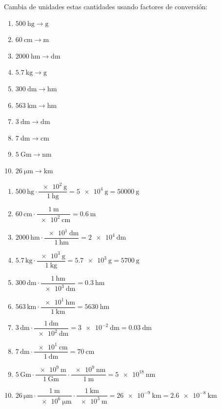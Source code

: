 \begin{exercise}
    Cambia de unidades estas cantidades usando factores de conversión:
    \begin{enumerate}[label=\letraminuscula]
        \item \(\qty{500}{\hecto\gram} \to \unit{\g}\)
        \item \(\qty{60}{\cm} \to \unit{\m}\)
        \item \(\qty{2000}{\hecto\m} \to \unit{\deca\m}\)
        \item \(\qty{5.7}{\kg} \to \unit{\g}\)
        \item \(\qty{300}{\dm} \to \unit{\hecto\m}\)
        \item \(\qty{563}{\km} \to \unit{\hecto\m}\)
        \item \(\qty{3}{\dm} \to \unit{\deca\m}\)
        \item \(\qty{7}{\dm} \to \unit{\cm}\)
        \item \(\qty{5}{\giga\m} \to \unit{\nano\m}\)
        \item \(\qty{26}{\micro\m} \to \unit{\km}\)
    \end{enumerate}
    \begin{solu}
        \begin{enumerate}[label=\alph*)]
            \item \(\num{500}\,\unit{\hecto\gram} \cdot \dfrac{\qty{e2}{\g}}{\qty{1}{\hecto\gram}} = \qty{5e4}{\g} = \qty{50000}{\g}\)
            \item \(\num{60}\,\unit{\cm} \cdot \dfrac{\qty{1}{\m}}{\qty{e2}{\cm}} = \qty{0.6}{\m}\)
            \item \(\num{2000}\,\unit{\hecto\m} \cdot \dfrac{\qty{e1}{\deca\m}}{\qty{1}{\hecto\m}} = \qty{2e4}{\deca\m}\)
            \item \(\num{5.7}\,\unit{\kg} \cdot \dfrac{\qty{e3}{\g}}{\qty{1}{\kg}} = \qty{5.7e3}{\g} = \qty{5700}{\g}\)
            \item \(\num{300}\,\unit{\dm} \cdot \dfrac{\qty{1}{\hecto\m}}{\qty{e3}{\dm}} = \qty{0.3}{\hecto\m}\)
            \item \(\num{563}\,\unit{\km} \cdot \dfrac{\qty{e1}{\hecto\m}}{\qty{1}{\km}} = \qty{5630}{\hecto\m}\)
            \item \(\num{3}\,\unit{\dm} \cdot \dfrac{\qty{1}{\deca\m}}{\qty{e2}{\dm}} = \qty{3e-2}{\deca\m} = \qty{0.03}{\deca\m}\)
            \item \(\num{7}\,\unit{\dm} \cdot \dfrac{\qty{e1}{\cm}}{\qty{1}{\dm}} = \qty{70}{\cm}\)
            \item \(\num{5}\,\unit{\giga\m} \cdot \dfrac{\qty{e9}{\m}}{\qty{1}{\giga\m}} \cdot \dfrac{\qty{e9}{\nano\m}}{\qty{1}{\m}} = \qty{5e18}{\nano\m}\)
            \item \(\num{26}\,\unit{\micro\m} \cdot \dfrac{\qty{1}{\m}}{\qty{e6}{\micro\m}} \cdot \dfrac{\qty{1}{\km}}{\qty{e3}{\m}} = \qty{26e-9}{\km} = \qty{2.6e-8}{\km}\)
        \end{enumerate}
    \end{solu}
\end{exercise}

